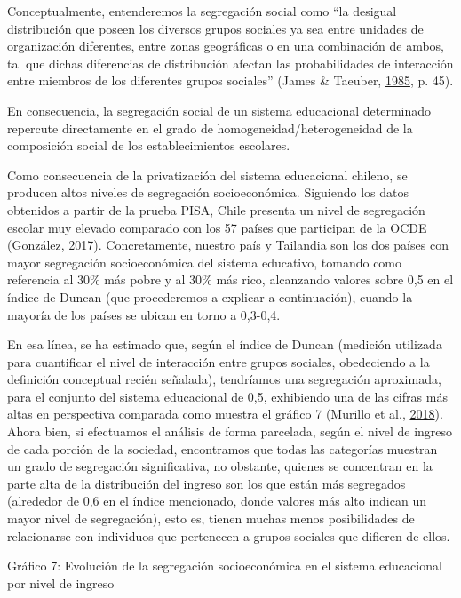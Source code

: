 \documentclass[
]{article}
\begin{document}
Conceptualmente, entenderemos la segregación social como ``la desigual
distribución que poseen los diversos grupos sociales ya sea entre
unidades de organización diferentes, entre zonas geográficas o en una
combinación de ambos, tal que dichas diferencias de distribución afectan
las probabilidades de interacción entre miembros de los diferentes
grupos sociales'' (James \& Taeuber,
\protect\hyperlink{ref-james_measures_1985}{1985}, p. 45).

En consecuencia, la segregación social de un sistema educacional
determinado repercute directamente en el grado de
homogeneidad/heterogeneidad de la composición social de los
establecimientos escolares.

Como consecuencia de la privatización del sistema educacional chileno,
se producen altos niveles de segregación socioeconómica. Siguiendo los
datos obtenidos a partir de la prueba PISA, Chile presenta un nivel de
segregación escolar muy elevado comparado con los 57 países que
participan de la OCDE (González,
\protect\hyperlink{ref-gonzalez_segregacion_2017}{2017}). Concretamente,
nuestro país y Tailandia son los dos países con mayor segregación
socioeconómica del sistema educativo, tomando como referencia al 30\%
más pobre y al 30\% más rico, alcanzando valores sobre 0,5 en el índice
de Duncan (que procederemos a explicar a continuación), cuando la
mayoría de los países se ubican en torno a 0,3-0,4.

En esa línea, se ha estimado que, según el índice de Duncan (medición
utilizada para cuantificar el nivel de interacción entre grupos
sociales, obedeciendo a la definición conceptual recién señalada),
tendríamos una segregación aproximada, para el conjunto del sistema
educacional de 0,5, exhibiendo una de las cifras más altas en
perspectiva comparada como muestra el gráfico 7 (Murillo et al.,
\protect\hyperlink{ref-murillo_evolucion_2018}{2018}). Ahora bien, si
efectuamos el análisis de forma parcelada, según el nivel de ingreso de
cada porción de la sociedad, encontramos que todas las categorías
muestran un grado de segregación significativa, no obstante, quienes se
concentran en la parte alta de la distribución del ingreso son los que
están más segregados (alrededor de 0,6 en el índice mencionado, donde
valores más alto indican un mayor nivel de segregación), esto es, tienen
muchas menos posibilidades de relacionarse con individuos que pertenecen
a grupos sociales que difieren de ellos.

Gráfico 7: Evolución de la segregación socioeconómica en el sistema
educacional por nivel de ingreso
\end{document}
